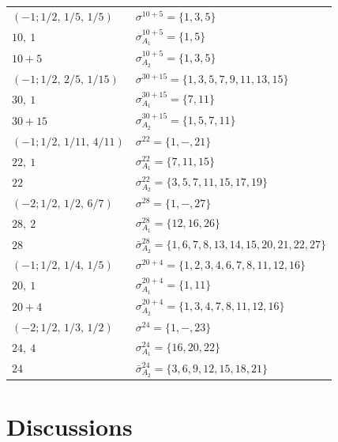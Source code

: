 \documentclass[10pt,a4paper]{amsart}
\theoremstyle{definition}
\numberwithin{equation}{section}
\begin{document}
\begin{table}[t]\centering\renewcommand{\arraystretch}{1.22}
\begin{tabular}{|ll|}\hline
$(-1;1/2,\,1/5,\,1/5) $& $\sigma^{10 + 5} = \{1,3,5\}$ \\
$10,\ 1$& $\sigma_{A_{1}}^{10 + 5} = \{1,5\}$ \\
$10 + 5$ & $\sigma_{A_{2}}^{10 + 5} = \{1,3,5\}$ \\
\hline
$(-1;1/2,\,2/5,\,1/15) $& $\sigma^{30 + 15} = \{1,3,5,7,9,11,13,15\}$ \\
$30,\ 1$& $\sigma_{A_{1}}^{30 + 15} = \{7,11\}$ \\
$30 + 15$ & $\sigma_{A_{2}}^{30 + 15} = \{1,5,7,11\}$ \\
\hline
$(-1;1/2,\,1/11,\,4/11) $& $\sigma^{22} = \{1,-,21\}$ \\
$22,\ 1$& $\sigma_{A_{1}}^{22} = \{7,11,15\}$ \\
$22$ & $\sigma_{A_{2}}^{22} = \{3,5,7,11,15,17,19\}$ \\
\hline
$(-2;1/2,\,1/2,\,6/7) $& $\sigma^{28} = \{1,-,27\}$ \\
$28,\ 2$& $\sigma_{A_{1}}^{28} = \{12,16,26\}$ \\
$28$ & $\bar\sigma_{A_{2}}^{28} = \{1,6,7,8,13,14,15,20,21,22,27\}$ \\
\hline
$(-1;1/2,\,1/4,\,1/5) $& $\sigma^{20 + 4} = \{1,2,3,4,6,7,8,11,12,16\}$ \\
$20,\ 1$& $\sigma_{A_{1}}^{20 + 4} = \{1,11\}$ \\
$20 + 4$ & $\sigma_{A_{2}}^{20 + 4} = \{1,3,4,7,8,11,12,16\}$ \\
\hline
$(-2;1/2,\,1/3,\,1/2) $& $\sigma^{24} = \{1,-,23\}$ \\
$24,\ 4$& $\sigma_{A_{1}}^{24} = \{16,20,22\}$ \\
$24$ & $\bar\sigma_{A_{2}}^{24} = \{3,6,9,12,15,18,21\}$ \\
\hline
\end{tabular}
\end{table}

\section{Discussions}\label{sec:discussions}
\end{document}
